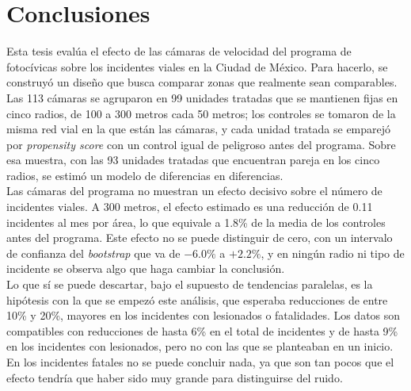 \chapter*{Conclusiones}

\noindent Esta tesis evalúa el efecto de las cámaras de velocidad del programa de fotocívicas sobre los incidentes viales en la Ciudad de México. Para hacerlo, se construyó un diseño que busca comparar zonas que realmente sean comparables. Las 113 cámaras se agruparon en 99 unidades tratadas que se mantienen fijas en cinco radios, de 100 a 300 metros cada 50 metros; los controles se tomaron de la misma red vial en la que están las cámaras, y cada unidad tratada se emparejó por \emph{propensity score} con un control igual de peligroso antes del programa. Sobre esa muestra, con las 93 unidades tratadas que encuentran pareja en los cinco radios, se estimó un modelo de diferencias en diferencias.\\

Las cámaras del programa no muestran un efecto decisivo sobre el número de incidentes viales. A 300 metros, el efecto estimado es una reducción de 0.11 incidentes al mes por área, lo que equivale a 1.8\% de la media de los controles antes del programa. Este efecto no se puede distinguir de cero, con un intervalo de confianza del \emph{bootstrap} que va de $-6.0\%$ a $+2.2\%$, y en ningún radio ni tipo de incidente se observa algo que haga cambiar la conclusión.\\

Lo que sí se puede descartar, bajo el supuesto de tendencias paralelas, es la hipótesis con la que se empezó este análisis, que esperaba reducciones de entre 10\% y 20\%, mayores en los incidentes con lesionados o fatalidades. Los datos son compatibles con reducciones de hasta 6\% en el total de incidentes y de hasta 9\% en los incidentes con lesionados, pero no con las que se planteaban en un inicio. En los incidentes fatales no se puede concluir nada, ya que son tan pocos que el efecto tendría que haber sido muy grande para distinguirse del ruido.\\

